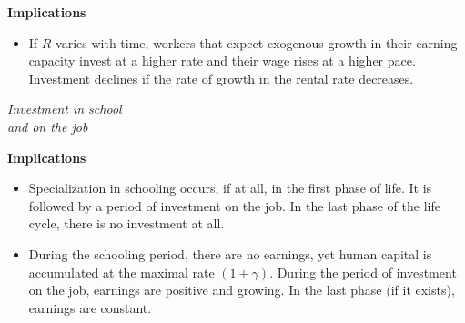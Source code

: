 \begin{frame}\textbf{Implications}\vspace{0.3cm}

\begin{itemize}\setlength\itemsep{1em}
\item If $R$ varies with time, workers that expect exogenous growth in their earning capacity invest at a higher rate and their wage rises at a higher pace. Investment declines if the rate of growth in the rental rate decreases.
\end{itemize}

\end{frame}
\begin{frame}\begin{center}
	\LARGE\textit{Investment in school \\ and on the job}
\end{center}\end{frame}
\begin{frame}\textbf{Implications}\vspace{0.3cm}

\begin{itemize}\setlength\itemsep{1em}
\item Specialization in schooling occurs, if at all, in the first phase of life. It is followed by a period of investment on the job. In the last phase of the life cycle, there is no investment at all.
\item During the schooling period, there are no earnings, yet human capital is accumulated at the maximal rate $(1 + \gamma )$. During the period of investment on the job, earnings are positive and growing. In the last phase (if it exists), earnings are constant.
\end{itemize}

\end{frame}
